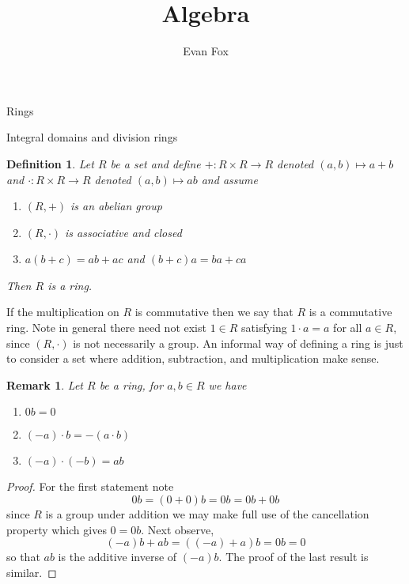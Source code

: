 \documentclass[11pt]{report}
\author{Evan Fox}
\title{Algebra}
\theoremstyle{break}
\newtheorem{defn}[thm]{Definition}
\newtheorem{rem}[thm]{Remark}
\begin{document}
\maketitle
\begin{chapter}{Rings}

\begin{section}{Integral domains and division rings}

    
    \begin{defn}
        Let $R$ be a set and define $+:R \times R \to R$ denoted $(a, b) \mapsto a + b$ and $\cdot: R \times R \to R$ denoted $(a, b) \mapsto ab$
        and assume 
        
        \begin{enumerate}
            \item $(R, +)$ is an abelian group 
            \item $(R, \cdot)$ is associative and closed 
            \item $a(b + c) = ab + ac$ and $(b + c)a = ba + ca$
        \end{enumerate}

        Then $R$ is a ring. 
    \end{defn}
If the multiplication on $R$ is commutative then we say that $R$ is a commutative ring. Note in general there need not exist $1 \in R$ satisfying $1 \cdot a = a$ for all $a \in R$, 
since $(R, \cdot)$ is not necessarily a group. An informal way of defining a ring is just to consider a set where addition, subtraction, and multiplication make sense. 

    
    \begin{rem}
        Let $R$ be a ring, for $a, b \in R$ we have 
        
        \begin{enumerate}
            \item $0b = 0$ 
            \item $(-a) \cdot b = -(a \cdot b)$
            \item $(-a) \cdot (-b) = ab $
        \end{enumerate}
    \end{rem}
    
    
    \begin{proof}
        For the first statement note 
        \[0b = (0 + 0)b = 0b = 0b + 0b\]
        since $R$ is a group under addition we may make full use of the cancellation property which gives $0 = 0b$. 
        Next observe, 
        \[(-a)b + ab = ((-a) + a)b = 0b = 0 \]
        so that $ab$ is the additive inverse of $(-a)b$. The proof of the last result is similar. 


\end{proof}
\end{section}
\end{chapter}
\end{document}
